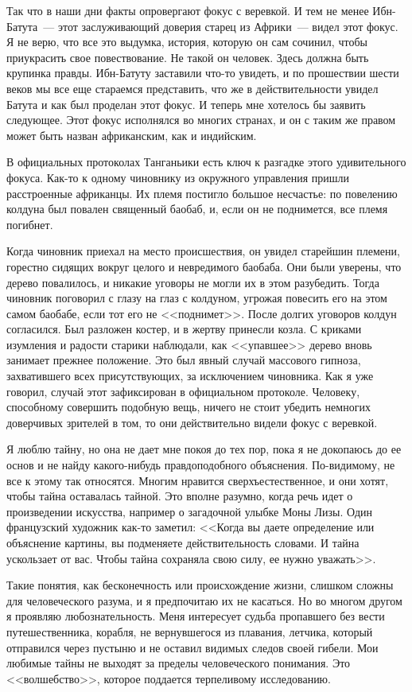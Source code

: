 \documentclass[12pt,a4paper,twoside,openany,svgnames]{memoir}
\begin{document}
Так что в наши дни факты опровергают фокус с веревкой. И тем не менее Ибн-Батута~--- этот заслуживающий доверия старец из Африки~--- видел этот фокус. Я не верю, что все это выдумка, история, которую он сам сочинил, чтобы приукрасить свое повествование. Не такой он человек. Здесь должна быть крупинка правды. Ибн-Батуту заставили что-то увидеть, и по прошествии шести веков мы все еще стараемся представить, что же в действительности увидел Батута и как был проделан этот фокус. И теперь мне хотелось бы заявить следующее. Этот фокус исполнялся во многих странах, и он с таким же правом может быть назван африканским, как и индийским.

В официальных протоколах Танганьики есть ключ к разгадке этого удивительного фокуса. Как-то к одному чиновнику из окружного управления пришли расстроенные африканцы. Их племя постигло большое несчастье: по повелению колдуна был повален священный баобаб, и, если он не поднимется, все племя погибнет.

Когда чиновник приехал на место происшествия, он увидел старейшин племени, горестно сидящих вокруг целого и невредимого баобаба. Они были уверены, что дерево повалилось, и никакие уговоры не могли их в этом разубедить. Тогда чиновник поговорил с глазу на глаз с колдуном, угрожая повесить его на этом самом баобабе, если тот его не <<поднимет>>. После долгих уговоров колдун согласился. Был разложен костер, и в жертву принесли козла. С криками изумления и радости старики наблюдали, как <<упавшее>> дерево вновь занимает прежнее положение. Это был явный случай массового гипноза, захватившего всех присутствующих, за исключением чиновника. Как я уже говорил, случай этот зафиксирован в официальном протоколе. Человеку, способному совершить подобную вещь, ничего не стоит убедить немногих доверчивых зрителей в том, то они действительно видели фокус с веревкой.

Я люблю тайну, но она не дает мне покоя до тех пор, пока я не докопаюсь до ее основ и не найду какого-нибудь правдоподобного объяснения. По-видимому, не все к этому так относятся. Многим нравится сверхъестественное, и они хотят, чтобы тайна оставалась тайной. Это вполне разумно, когда речь идет о произведении искусства, например о загадочной улыбке Моны Лизы. Один французский художник как-то заметил: <<Когда вы даете определение или объяснение картины, вы подменяете действительность словами. И тайна ускользает от вас. Чтобы тайна сохраняла свою силу, ее нужно уважать>>.

Такие понятия, как бесконечность или происхождение жизни, слишком сложны для человеческого разума, и я предпочитаю их не касаться. Но во многом другом я проявляю любознательность. Меня интересует судьба пропавшего без вести путешественника, корабля, не вернувшегося из плавания, летчика, который отправился через пустыню и не оставил видимых следов своей гибели. Мои любимые тайны не выходят за пределы человеческого понимания. Это <<волшебство>>, которое поддается терпеливому исследованию.
\end{document}
